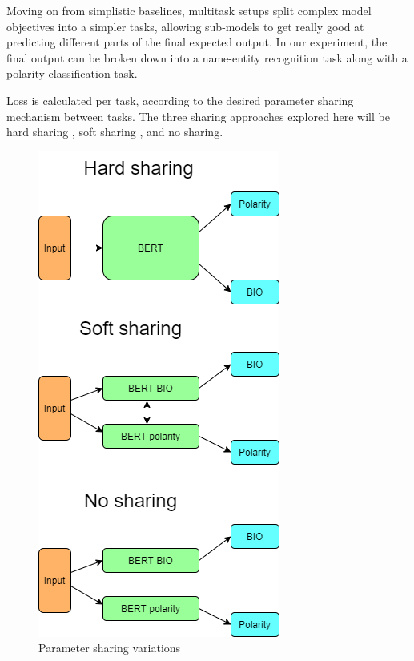 \documentclass[11pt,a4paper]{article}
\begin{document}
%

Moving on from simplistic baselines, multitask setups split complex model objectives into a simpler tasks, allowing sub-models to get really good at predicting different parts of the final expected output. In our experiment, the final output can be broken down into a name-entity recognition task along with a polarity classification task.  

Loss is calculated per task, according to the desired parameter sharing mechanism between tasks. The three sharing approaches explored here will be hard sharing \cite{Caruana1993MultitaskLA}, soft sharing \cite{liu2016recursrent}, and no sharing.

\begin{figure}[!htb]
    \centering
    \includegraphics[height=.3\textheight]{pictures/sharing-in5550.png}
    \caption{Parameter sharing variations}
    \label{fig:paramsharing}
\end{figure}
\end{document}

